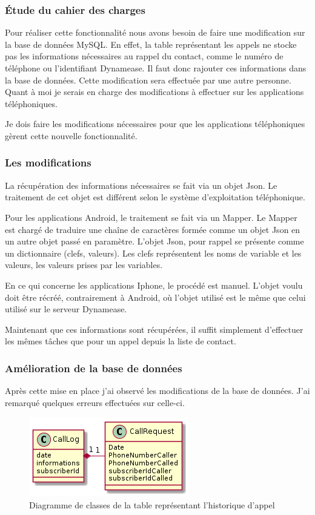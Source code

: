 \subsubsection{Étude du cahier des charges}

Pour réaliser cette fonctionnalité nous avons besoin de faire une modification sur la base de données MySQL. En effet, la table représentant les appels ne stocke pas les informations nécessaires au rappel du contact, comme le numéro de téléphone ou l'identifiant Dynamease. Il faut donc rajouter ces informations dans la base de données. Cette modification sera effectuée par une autre personne. Quant à moi je serais en charge des modifications à effectuer sur les applications téléphoniques.

Je dois faire les modifications nécessaires pour que les applications téléphoniques gèrent cette nouvelle fonctionnalité.

\subsubsection{Les modifications}

La récupération des informations nécessaires se fait via un objet Json. Le traitement de cet objet est différent selon le système d'exploitation téléphonique.

Pour les applications Android, le traitement se fait via un Mapper. Le Mapper est chargé de traduire une chaîne de caractères formée comme un objet Json en un autre objet passé en paramètre. L'objet Json, pour rappel se présente comme un dictionnaire (clefs, valeurs). Les clefs représentent les noms de variable et les valeurs, les valeurs prises par les variables.

En ce qui concerne les applications Iphone, le procédé est manuel. L'objet voulu doit être récréé, contrairement à Android, où l'objet utilisé est le même que celui utilisé sur le serveur Dynamease.

Maintenant que ces informations sont récupérées, il suffit simplement d'effectuer les mêmes tâches que pour un appel depuis la liste de contact.

\subsubsection{Amélioration de la base de données}

Après cette mise en place j'ai observé les modifications de la base de données. J'ai remarqué quelques erreurs effectuées sur celle-ci.
\newpage
\begin{figure}[!h]
	\centering
	\includegraphics[scale=1]{img/classeCallLogOld.png}
	\caption{\label{class_callLog_old} Diagramme de classes de la table représentant l'historique d'appel}
\end{figure}

